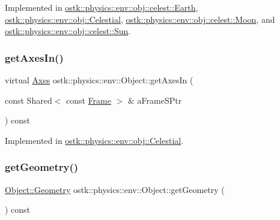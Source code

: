 Implemented in \hyperlink{classostk_1_1physics_1_1env_1_1obj_1_1celest_1_1_earth_ae86664b9d6fc870baa1dac5c3219f784}{ostk\+::physics\+::env\+::obj\+::celest\+::\+Earth}, \hyperlink{classostk_1_1physics_1_1env_1_1obj_1_1_celestial_a87c6f3ec3c0ec9758ae52e3edc3fc5df}{ostk\+::physics\+::env\+::obj\+::\+Celestial}, \hyperlink{classostk_1_1physics_1_1env_1_1obj_1_1celest_1_1_moon_adcfeda7b73d32df67f5b38c05ca9351a}{ostk\+::physics\+::env\+::obj\+::celest\+::\+Moon}, and \hyperlink{classostk_1_1physics_1_1env_1_1obj_1_1celest_1_1_sun_a57fd7c3c48115f77e2d3d331ef0e8e0a}{ostk\+::physics\+::env\+::obj\+::celest\+::\+Sun}.

\mbox{\label{classostk_1_1physics_1_1env_1_1_object_a706d29c77ce311a3abcf2a6060515711}} 
\subsubsection{\texorpdfstring{get\+Axes\+In()}{getAxesIn()}}
{\footnotesize\ttfamily virtual \hyperlink{classostk_1_1physics_1_1coord_1_1_axes}{Axes} ostk\+::physics\+::env\+::\+Object\+::get\+Axes\+In (\begin{DoxyParamCaption}\item[{const Shared$<$ const \hyperlink{classostk_1_1physics_1_1coord_1_1_frame}{Frame} $>$ \&}]{a\+Frame\+S\+Ptr }\end{DoxyParamCaption}) const\hspace{0.3cm}{\ttfamily [pure virtual]}}



Implemented in \hyperlink{classostk_1_1physics_1_1env_1_1obj_1_1_celestial_a52b8cd88b947ca97f94981e5d3e10677}{ostk\+::physics\+::env\+::obj\+::\+Celestial}.

\mbox{\label{classostk_1_1physics_1_1env_1_1_object_aa74070ed996907de5a2821233d1aa555}} 
\subsubsection{\texorpdfstring{get\+Geometry()}{getGeometry()}}
{\footnotesize\ttfamily \hyperlink{classostk_1_1physics_1_1env_1_1_object_a66e44a65aefb23a184a6de531e96935d}{Object\+::\+Geometry} ostk\+::physics\+::env\+::\+Object\+::get\+Geometry (\begin{DoxyParamCaption}{ }\end{DoxyParamCaption}) const}

